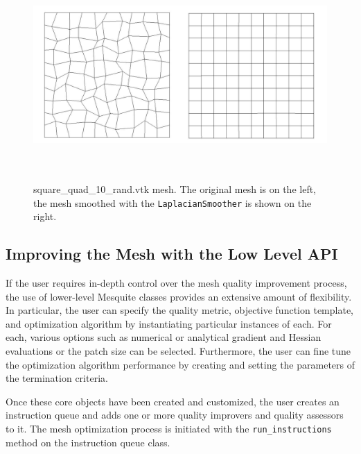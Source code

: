 \begin{figure}[htbp]
\begin{center}
    \includegraphics[height=80mm]{figures/square_rand}
    \caption{square\_quad\_10\_rand.vtk mesh. The original mesh is on the left, the mesh smoothed with the \texttt{LaplacianSmoother} is shown on the right.}
    \label{fig:square_rand}
\end{center}
\end{figure}


\subsection{Improving the Mesh with the Low Level API}
\label{sec:tutDetailedAPI}
If the user requires in-depth control over the mesh quality improvement
process, the use of lower-level Mesquite classes provides an extensive
amount of flexibility.   In particular, the user can specify the quality
metric, objective function template, and optimization algorithm by
instantiating particular instances of each.  For each, various options
such as numerical or analytical gradient and Hessian evaluations or
the patch size can be selected.  Furthermore, the user can fine tune
the optimization algorithm performance by creating and setting the parameters
of the termination criteria.

Once these core objects have been created and customized, the user
creates an instruction queue and adds one or more quality improvers
and quality assessors to it.  The mesh optimization process is initiated
with the {\tt run\_instructions} method on the instruction queue
class.

